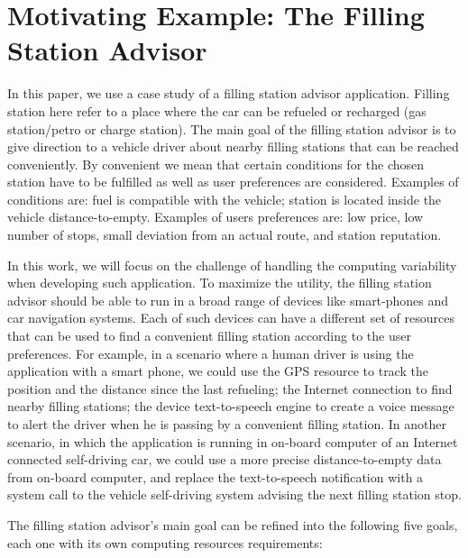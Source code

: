 \section{Motivating Example: The Filling Station Advisor}
\label{sec:case_study}

In this paper, we use a case study of a filling station advisor application. Filling station here refer to a place where the car can be refueled or recharged (gas station/petro or charge station). The main goal of the filling station advisor is to give direction to a vehicle driver about nearby filling stations that can be reached conveniently. By convenient we mean that certain conditions for the chosen station have to be fulfilled as well as user preferences are considered. Examples of conditions are: fuel is compatible with the vehicle; station is located inside the vehicle distance-to-empty. Examples of users preferences are: low price, low number of stops, small deviation from an actual route, and station reputation.

In this work, we will focus on the challenge of handling the computing variability when developing such application. To maximize the utility, the filling station advisor should be able to run in a broad range of devices like smart-phones and car navigation systems. Each of such devices can have a different set of resources that can be used to find a convenient filling station according to the user preferences. For example, in a scenario where a human driver is using the application with a smart phone, we could use the GPS resource to track the position and the distance since the last refueling; the Internet connection to find nearby filling stations; the device text-to-speech engine to create a voice message to alert the driver when he is passing by a convenient filling station. In another scenario, in which the application is running in on-board computer of an Internet connected self-driving car, we could use a more precise distance-to-empty data from on-board computer, and replace the text-to-speech notification with a system call to the vehicle self-driving system advising the next filling station stop.

The filling station advisor's main goal can be refined into the following five goals, each one with its own computing resources requirements:

